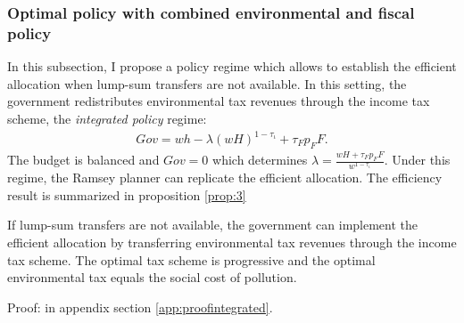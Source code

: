  \begin{comment}
Complementarity of the two instruments is intuitive. The use of labor taxes is not primarily to handle the environmental externality but instead to cope with a distortion induced by environmental taxation. 
This conclusion is backed by the observation that the externality measure, $U_F$, drops from the planner's first order condition on hours, equation \ref{eq:sbh}, if the environmental externality is taken care of by the environmental tax. Then, labor supply is determined solely by the trade-off between consumption and leisure.\footnote{\ On this argument see the proof on the optimality of $\tau_\iota^*=0$ when lump-sum transfers are available in appendix section \ref{app:incometax0}.} 

content...
\end{comment}
 

 

\subsubsection{Optimal policy with combined environmental and fiscal policy}\label{subsec:integrated}

In this subsection, I propose a policy regime which allows to establish the efficient allocation when lump-sum transfers are not available. In this setting, the government redistributes environmental tax revenues through the income tax scheme, the \textit{integrated policy} regime:  
\begin{align}
Gov= wh-\lambda (wH)^{1-\tau_\iota}+\tau_F p_FF.
\end{align}
The budget is balanced and $Gov = 0$ which determines $\lambda=\frac{wH + \tau_F p_F F}{w^{1-\tau_{\iota}}}$. 
Under this regime, the Ramsey planner can replicate the efficient allocation. 
The efficiency result is summarized in proposition \ref{prop:3}

\begin{prop}\label{prop:3}
	If lump-sum transfers are not available, the government can implement the efficient allocation by  transferring environmental tax revenues through the income tax scheme. The optimal tax scheme is progressive and the optimal environmental tax equals the social cost of pollution. %
\end{prop}
Proof: in appendix section \ref{app:proofintegrated}. 

